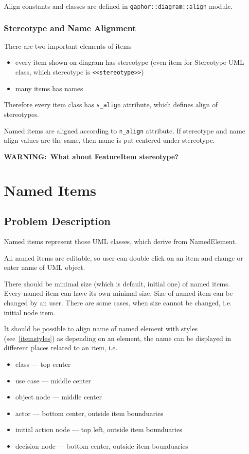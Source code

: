 \documentclass{book}
\newcommand{\rmodule}[1]{\texttt{#1}}
\newcommand{\rattr}[1]{\texttt{#1}}
\newcommand{\rstereotype}[1]{\texttt{<<#1>>}}
\newcommand{\warning}[1]{\textbf{WARNING:~#1}}
\begin{document}
Align constants and classes are defined in \rmodule{gaphor::diagram::align} module.

\subsection{Stereotype and Name Alignment}

There are two important elements of items
\begin{itemize}
\item every item shown on diagram has stereotype (even item for Stereotype
    UML class, which stereotype is \rstereotype{stereotype})
\item many items has names
\end{itemize}

Therefore every item class has \rattr{s\_align} attribute, which defines
align of stereotypes.

Named items are aligned according to \rattr{n\_align} attribute. If
stereotype and name align values are the same, then name is put
centered under stereotype.

\warning{What about FeatureItem stereotype?}

\chapter{Named Items}
\section{Problem Description}
Named items represent those UML classes, which derive from NamedElement.

All named items are editable, so user can double click on an item and
change or enter name of UML object.

There should be minimal size (which is default, initial one) of named
items. Every named item can have its own minimal size. Size of named item
can be changed by an user. There are some cases, when size cannot be
changed, i.e. initial node item.

It should be possible to align name of named element with styles
(see~\ref{itemstyles}) as depending on an element, the name can be
displayed in different places related to an item, i.e.
\begin{itemize}
\item class               --- top center
\item use case            --- middle center
\item object node         --- middle center
\item actor               --- bottom center, outside item bounduaries
\item initial action node --- top left, outside item bounduaries
\item decision node       --- bottom center, outside item bounduaries
\end{itemize}
\end{document}
